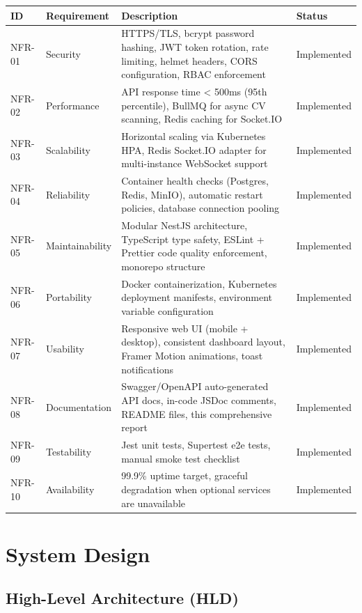 \documentclass[12pt,a4paper]{report}
\begin{document}
\begin{longtable}{|p{0.8cm}|p{5cm}|p{5cm}|p{2.5cm}|}
\hline
\textbf{ID} & \textbf{Requirement} & \textbf{Description} & \textbf{Status} \\
\hline
NFR-01 & Security & HTTPS/TLS, bcrypt password hashing, JWT token rotation, rate limiting, helmet headers, CORS configuration, RBAC enforcement & Implemented \\
\hline
NFR-02 & Performance & API response time < 500ms (95th percentile), BullMQ for async CV scanning, Redis caching for Socket.IO & Implemented \\
\hline
NFR-03 & Scalability & Horizontal scaling via Kubernetes HPA, Redis Socket.IO adapter for multi-instance WebSocket support & Implemented \\
\hline
NFR-04 & Reliability & Container health checks (Postgres, Redis, MinIO), automatic restart policies, database connection pooling & Implemented \\
\hline
NFR-05 & Maintainability & Modular NestJS architecture, TypeScript type safety, ESLint + Prettier code quality enforcement, monorepo structure & Implemented \\
\hline
NFR-06 & Portability & Docker containerization, Kubernetes deployment manifests, environment variable configuration & Implemented \\
\hline
NFR-07 & Usability & Responsive web UI (mobile + desktop), consistent dashboard layout, Framer Motion animations, toast notifications & Implemented \\
\hline
NFR-08 & Documentation & Swagger/OpenAPI auto-generated API docs, in-code JSDoc comments, README files, this comprehensive report & Implemented \\
\hline
NFR-09 & Testability & Jest unit tests, Supertest e2e tests, manual smoke test checklist & Implemented \\
\hline
NFR-10 & Availability & 99.9\% uptime target, graceful degradation when optional services are unavailable & Implemented \\
\hline
\end{longtable}

\section{System Design}

\subsection{High-Level Architecture (HLD)}
\end{document}
